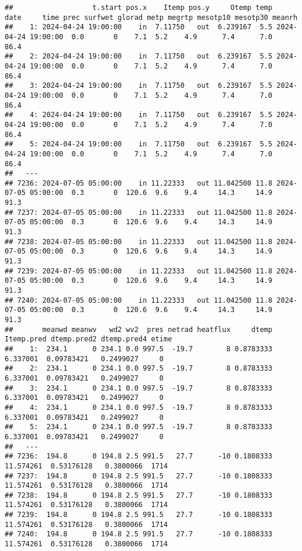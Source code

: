 \documentclass[
]{article}
\begin{document}
\begin{verbatim}
##                   t.start pos.x    Itemp pos.y     Otemp temp       date     time prec surfwet glorad metp megrtp mesotp10 mesotp30 meanrh
##    1: 2024-04-24 19:00:00    in  7.11750   out  6.239167  5.5 2024-04-24 19:00:00  0.0       0    7.1  5.2    4.9      7.4      7.0   86.4
##    2: 2024-04-24 19:00:00    in  7.11750   out  6.239167  5.5 2024-04-24 19:00:00  0.0       0    7.1  5.2    4.9      7.4      7.0   86.4
##    3: 2024-04-24 19:00:00    in  7.11750   out  6.239167  5.5 2024-04-24 19:00:00  0.0       0    7.1  5.2    4.9      7.4      7.0   86.4
##    4: 2024-04-24 19:00:00    in  7.11750   out  6.239167  5.5 2024-04-24 19:00:00  0.0       0    7.1  5.2    4.9      7.4      7.0   86.4
##    5: 2024-04-24 19:00:00    in  7.11750   out  6.239167  5.5 2024-04-24 19:00:00  0.0       0    7.1  5.2    4.9      7.4      7.0   86.4
##   ---                                                                                                                                     
## 7236: 2024-07-05 05:00:00    in 11.22333   out 11.042500 11.8 2024-07-05 05:00:00  0.3       0  120.6  9.6    9.4     14.3     14.9   91.3
## 7237: 2024-07-05 05:00:00    in 11.22333   out 11.042500 11.8 2024-07-05 05:00:00  0.3       0  120.6  9.6    9.4     14.3     14.9   91.3
## 7238: 2024-07-05 05:00:00    in 11.22333   out 11.042500 11.8 2024-07-05 05:00:00  0.3       0  120.6  9.6    9.4     14.3     14.9   91.3
## 7239: 2024-07-05 05:00:00    in 11.22333   out 11.042500 11.8 2024-07-05 05:00:00  0.3       0  120.6  9.6    9.4     14.3     14.9   91.3
## 7240: 2024-07-05 05:00:00    in 11.22333   out 11.042500 11.8 2024-07-05 05:00:00  0.3       0  120.6  9.6    9.4     14.3     14.9   91.3
##       meanwd meanwv   wd2 wv2  pres netrad heatflux     dtemp Itemp.pred dtemp.pred2 dtemp.pred4 etime
##    1:  234.1      0 234.1 0.0 997.5  -19.7        8 0.8783333   6.337001  0.09783421   0.2499027     0
##    2:  234.1      0 234.1 0.0 997.5  -19.7        8 0.8783333   6.337001  0.09783421   0.2499027     0
##    3:  234.1      0 234.1 0.0 997.5  -19.7        8 0.8783333   6.337001  0.09783421   0.2499027     0
##    4:  234.1      0 234.1 0.0 997.5  -19.7        8 0.8783333   6.337001  0.09783421   0.2499027     0
##    5:  234.1      0 234.1 0.0 997.5  -19.7        8 0.8783333   6.337001  0.09783421   0.2499027     0
##   ---                                                                                                 
## 7236:  194.8      0 194.8 2.5 991.5   27.7      -10 0.1808333  11.574261  0.53176128   0.3800066  1714
## 7237:  194.8      0 194.8 2.5 991.5   27.7      -10 0.1808333  11.574261  0.53176128   0.3800066  1714
## 7238:  194.8      0 194.8 2.5 991.5   27.7      -10 0.1808333  11.574261  0.53176128   0.3800066  1714
## 7239:  194.8      0 194.8 2.5 991.5   27.7      -10 0.1808333  11.574261  0.53176128   0.3800066  1714
## 7240:  194.8      0 194.8 2.5 991.5   27.7      -10 0.1808333  11.574261  0.53176128   0.3800066  1714
\end{verbatim}
\end{document}
